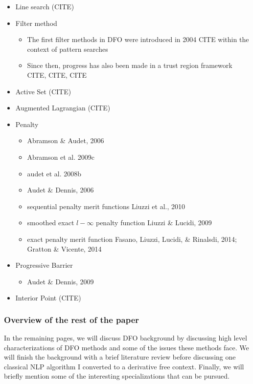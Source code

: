 \documentclass{article}
\begin{document}
\begin{itemize}
	\item Line search (CITE)
	\item Filter method
	\begin{itemize}
		\item The first filter methods in DFO were introduced in 2004 CITE within the context of pattern searches
		\item Since then, progress has also been made in a trust region framework CITE, CITE, CITE
	\end{itemize}
	\item Active Set (CITE)
	\item Augmented Lagrangian (CITE)
	\item Penalty
	\begin{itemize}
		\item Abramson \& Audet, 2006
		\item Abramson et al. 2009c
		\item audet et al. 2008b
		\item Audet \& Dennis, 2006
		\item sequential penalty merit functions Liuzzi et al., 2010
		\item smoothed exact $l-\infty$ penalty function Liuzzi \& Lucidi, 2009
		\item exact penalty merit function Fasano, Liuzzi, Lucidi, \& Rinalsdi, 2014; Gratton \& Vicente, 2014
	\end{itemize}
	\item Progressive Barrier
	\begin{itemize}
		\item Audet \& Dennis, 2009
	\end{itemize}
	\item Interior Point (CITE)
\end{itemize}

\subsubsection{Overview of the rest of the paper}

In the remaining pages, we will discuss DFO background by discussing high level characterizations of DFO methods and some of the issues these methods face.
We will finish the background with a brief literature review before discussing one classical NLP algorithm I converted to a derivative free context.
Finally, we will briefly mention some of the interesting specializations that can be pursued.
\end{document}
